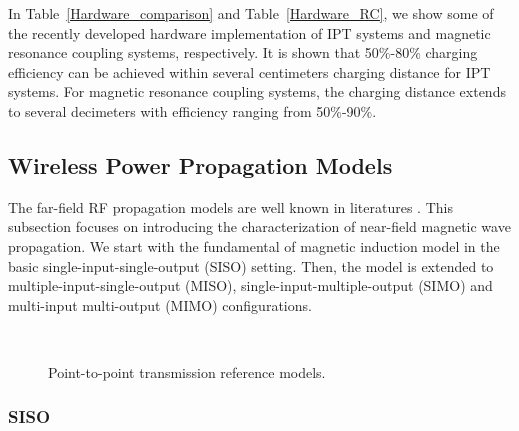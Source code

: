 \documentclass[twocolumn,10pt]{IEEEtran}
\begin{document}
  

In Table~\ref{Hardware_comparison} and Table~\ref{Hardware_RC}, we show some of the recently developed hardware implementation of IPT systems and magnetic resonance coupling systems, respectively. It is shown that 50$\%$-80$\%$ charging efficiency can be achieved within several centimeters charging distance for IPT systems. For magnetic resonance coupling systems, the charging distance extends to several decimeters with efficiency ranging from 50$\%$-90$\%$.



\subsection{Wireless Power Propagation Models}
The far-field RF propagation models are well known in literatures \cite{P.2006Barsocchi,P.2007Almers}. This subsection focuses on introducing the characterization of near-field magnetic wave propagation. We start with the fundamental of magnetic induction model in the basic single-input-single-output (SISO) setting. Then, the model is extended to multiple-input-single-output (MISO), single-input-multiple-output (SIMO) and multi-input multi-output (MIMO) configurations.
 
 \begin{figure} 
 \centering
  \centering
     \\
   \centering
 \centering
 \centering
 \caption{Point-to-point transmission reference models.} 
 \label{P2P_model}
 \end{figure}
 

 
\subsubsection{SISO}
\end{document}
